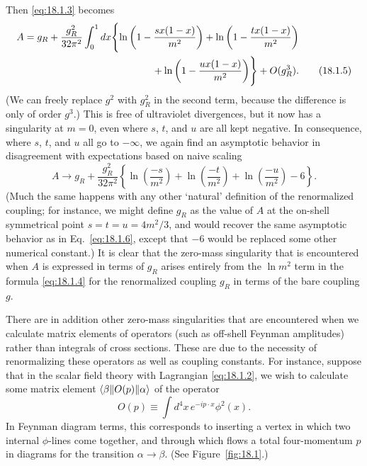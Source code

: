 Then \eqref{eq:18.1.3} becomes
\begin{align}
 A={}&g_R+\frac{g_R^2}{32\pi^2}\int_0^1dx\Biggl\{
 \ln\left(1-\frac{sx(1-x)}{m^2}\right)
 +\ln\left(1-\frac{tx(1-x)}{m^2}\right) \notag\\
 &\hspace{41mm}
 +\ln\left(1-\frac{ux(1-x)}{m^2}\right)\Biggr\}+O(g_R^3) .
 \tag{18.1.5}
 \label{eq:18.1.5}
\end{align}
(We can freely replace $g^2$ with $g_R^2$ in the second term, because the
difference is only of order $g^3$.) This is free of ultraviolet divergences,
but it now has a singularity at $m=0$, even where $s$, $t$, and $u$ are all
kept negative. In consequence, where $s$, $t$, and $u$ all go to $-\infty$,
we again find an asymptotic behavior in disagreement with expectations based
on naive scaling
\begin{equation}
 A\longrightarrow g_R+\frac{g_R^2}{32\pi^2}
 \left\{\ln\left(\frac{-s}{m^2}\right)
 +\ln\left(\frac{-t}{m^2}\right)
 +\ln\left(\frac{-u}{m^2}\right)-6\right\} .
 \tag{18.1.6}
 \label{eq:18.1.6}
\end{equation}
(Much the same happens with any other `natural' definition of the
renormalized coupling; for instance, we might define $g_R$ as the value of
$A$ at the on-shell symmetrical point $s=t=u=4m^2/3$, and would recover the
same asymptotic behavior as in Eq.~\eqref{eq:18.1.6}, except that $-6$ would
be replaced some other numerical constant.) It is clear that the zero-mass
singularity that is encountered when $A$ is expressed in terms of $g_R$
arises entirely from the $\ln m^2$ term in the formula \eqref{eq:18.1.4} for
the renormalized coupling $g_R$ in terms of the bare coupling $g$.

There are in addition other zero-mass singularities that are encountered when
we calculate matrix elements of operators (such as off-shell Feynman
amplitudes) rather than integrals of cross sections. These are due to the
necessity of renormalizing these operators as well as coupling constants. For
instance, suppose that in the scalar field theory with Lagrangian
\eqref{eq:18.1.2}, we wish to calculate some matrix element
$\langle \beta\rVert O(p)\lVert \alpha\rangle$ of the operator
\begin{equation}
 O(p)\equiv\int d^4x\,e^{-ip\cdot x}\phi^2(x) .
 \tag{18.1.7}
 \label{eq:18.1.7}
\end{equation}
In Feynman diagram terms, this corresponds to inserting a vertex in which two
internal $\phi$-lines come together, and through which flows a total
four-momentum $p$ in diagrams for the transition $\alpha\to\beta$. (See
Figure~\ref{fig:18.1}.)

